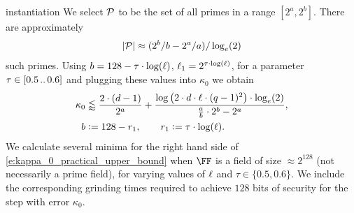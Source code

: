 \begin{lncsappendix}{instantiation}
%
%
    We select $\mathcal{P}$ to be the set of all primes in a range $[2^a, 2^b]$. There are approximately  $$|\mathcal{P}|\approx (2^b/b - 2^a/a)/\log_e(2)$$ such primes.  Using $b= 128 - \tau \cdot \log(\ell)$,  $\ell_1= 2^{\tau\cdot \log(\ell)}$,  for a parameter $\tau \in [0.5 \, .. \, 0.6]$ and plugging these values into $\kappa_0$ we obtain
     \begin{equation}\label{e:kappa_0_practical_upper_bound}
     \begin{aligned}
    \kappa_0&\lessapprox \frac{2\cdot (d-1)}{2^a} + \frac{\log\left(2\cdot d\cdot \ell\cdot (q-1)^2\right)\cdot \log_e(2)}{\frac{a}{b}\cdot 2^{b} - 2^a},\\
    b&{\;\vcentcolon=\;} 128 - r_1, \qquad r_1{\;\vcentcolon=\;} \tau\cdot \log(\ell).
    \end{aligned}
    \end{equation}
    We calculate several minima for the right hand side of \eqref{e:kappa_0_practical_upper_bound} when $\FF$ is a  field of size $\approx 2^{128}$ (not necessarily a prime field), for varying values of $\ell$ and $\tau \in \{0.5, 0.6\}$. We include the corresponding grinding times required to  achieve $128$ bits of security for the step with error $\kappa_0$.  

    

\end{lncsappendix}
